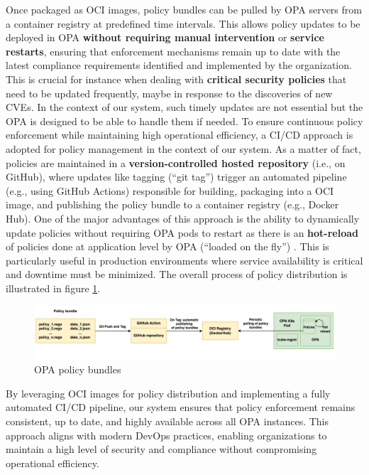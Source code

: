 Once packaged as OCI images, policy bundles can be pulled by OPA servers from a container registry at predefined time intervals. This allows policy updates to be deployed in OPA \textbf{without requiring manual intervention} or \textbf{service restarts}, ensuring that enforcement mechanisms remain up to date with the latest compliance requirements identified and implemented by the organization. This is crucial for instance when dealing with \textbf{critical security policies} that need to be updated frequently, maybe in response to the discoveries of new CVEs. In the context of our system, such timely updates are not essential but the OPA is designed to be able to handle them if needed.
To ensure continuous policy enforcement while maintaining high operational efficiency, a CI/CD approach is adopted for policy management in the context of our system.
As a matter of fact, policies are maintained in a \textbf{version-controlled hosted repository} (i.e., on GitHub), where updates like tagging (``git tag'') trigger an automated pipeline (e.g., using GitHub Actions) responsible for building, packaging into a OCI image, and publishing the policy bundle to a container registry (e.g., Docker Hub).
One of the major advantages of this approach is the ability to dynamically update policies without requiring OPA pods to restart as there is an \textbf{hot-reload} of policies done at application level by OPA (``loaded on the fly'') \cite{opa_bundles}. This is particularly useful in production environments where service availability is critical and downtime must be minimized. 
The overall process of policy distribution is illustrated in figure \ref{fig:opa_bundles}.

\begin{figure}[H]
\centering
\includegraphics[width=1\linewidth]{images/opa_bundles.png}
\caption{OPA policy bundles}
\label{fig:opa_bundles}
\end{figure}

By leveraging OCI images for policy distribution and implementing a fully automated CI/CD pipeline, our system ensures that policy enforcement remains consistent, up to date, and highly available across all OPA instances. This approach aligns with modern DevOps practices, enabling organizations to maintain a high level of security and compliance without compromising operational efficiency.

